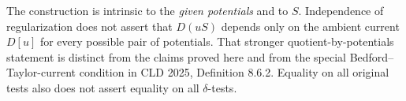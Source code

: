 \begin{remark}
The construction is intrinsic to the \emph{given potentials} and to $S$.
Independence of regularization does not assert that $D(uS)$ depends only
on the ambient current $D[u]$ for every possible pair of potentials.
That stronger quotient-by-potentials statement is distinct from the
claims proved here and from the special Bedford--Taylor-current
condition in CLD 2025, Definition 8.6.2. Equality on all original tests
also does not assert equality on all $\delta$-tests.
\end{remark}
